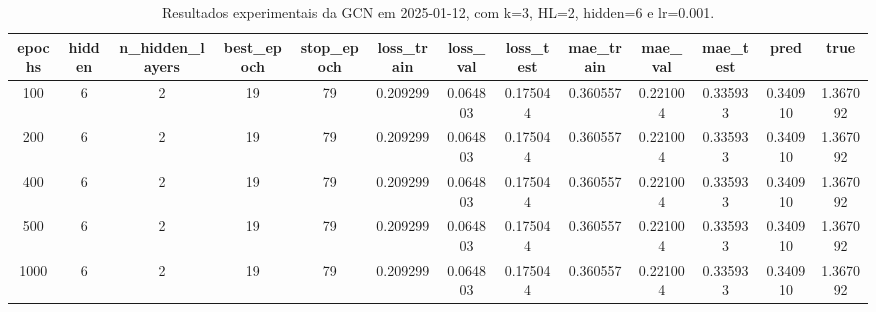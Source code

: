 \begin{table}[h]
\centering
\caption{Resultados experimentais da GCN em 2025-01-12, com k=3, HL=2, hidden=6 e lr=0.001.}
\label{tab:gcn_results_k3_hl2_h6_d20250112}
\begin{tabular}{ccccccccccccc}
\toprule
epochs & hidden & n\_hidden\_layers & best\_epoch & stop\_epoch & loss\_train & loss\_val & loss\_test & mae\_train & mae\_val & mae\_test & pred & true \\
\midrule
100 & 6 & 2 & 19 & 79 & 0.209299 & 0.064803 & 0.175044 & 0.360557 & 0.221004 & 0.335933 & 0.340910 & 1.367092 \\
200 & 6 & 2 & 19 & 79 & 0.209299 & 0.064803 & 0.175044 & 0.360557 & 0.221004 & 0.335933 & 0.340910 & 1.367092 \\
400 & 6 & 2 & 19 & 79 & 0.209299 & 0.064803 & 0.175044 & 0.360557 & 0.221004 & 0.335933 & 0.340910 & 1.367092 \\
500 & 6 & 2 & 19 & 79 & 0.209299 & 0.064803 & 0.175044 & 0.360557 & 0.221004 & 0.335933 & 0.340910 & 1.367092 \\
1000 & 6 & 2 & 19 & 79 & 0.209299 & 0.064803 & 0.175044 & 0.360557 & 0.221004 & 0.335933 & 0.340910 & 1.367092 \\
\bottomrule
\end{tabular}
\end{table}
